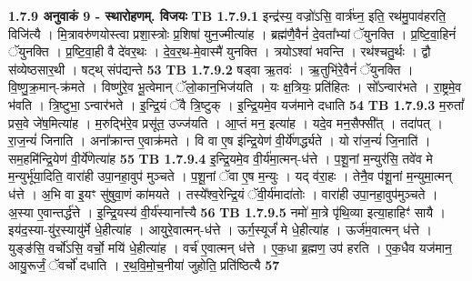 \documentclass[17pt]{extarticle}
\begin{document}
                \textbf{ 1.7.9     अनुवाकं   9 - स्थारोहणम्. विजयः} \newline
                                \textbf{ TB 1.7.9.1} \newline
                  इन्द्र॑स्य॒ वज्रो॑ऽसि॒ वार्त्र॑घ्न॒ इति॒ रथ॑मु॒पाव॑हरति॒ विजि॑त्यै । मि॒त्रावरु॑णयोस्त्वा प्रशा॒स्त्रोः प्र॒शिषा॑ युन॒ज्मीत्या॑ह । ब्रह्म॑णै॒वैनं॑ दे॒वता᳚भ्यां ॅयुनक्ति । प्र॒ष्टि॒वा॒हिनं॑ ॅयुनक्ति । प्र॒ष्टि॒वा॒ही वै दे॑वर॒थः । दे॒व॒र॒थ-मे॒वास्मै॑ युनक्ति । त्रयोऽश्वा॑ भवन्ति । रथ॑श्चतु॒र्थः । द्वौ स॑व्येष्ठसार॒थी । षट्थ् संप॑द्यन्ते \textbf{ 53} \newline
                  \newline
                                \textbf{ TB 1.7.9.2} \newline
                  षड्वा ऋ॒तवः॑ । ऋ॒तुभि॑रे॒वैनं॑ ॅयुनक्ति । वि॒ष्णु॒क्र॒मान्-क्र॑मते । विष्णु॑रे॒व भू॒त्वेमान् ॅलो॒कान॒भिज॑यति । यः क्ष॒त्रियः॒ प्रति॑हितः । सो᳚ऽन्वार॑भते । रा॒ष्ट्रमे॒व भ॑वति । त्रि॒ष्टुभा॒ ऽन्वार॑भते । इ॒न्द्रि॒यं ॅवै त्रि॒ष्टुक् । इ॒न्द्रि॒यमे॒व यज॑माने दधाति \textbf{ 54} \newline
                  \newline
                                \textbf{ TB 1.7.9.3} \newline
                  म॒रुतां᳚ प्रस॒वे जे॑ष॒मित्या॑ह । म॒रुद्भि॑रे॒व प्रसू॑त॒ उज्ज॑यति । आ॒प्तं मन॒ इत्या॑ह । यदे॒व मन॒सैफ्सी᳚त् । तदा॑पत् । रा॒ज॒न्यं॑ जिनाति । अना᳚क्रान्त ए॒वाक्र॑मते । वि वा ए॒ष इ॑न्द्रि॒येण॑ वी॒र्ये॑णर्द्ध्यते । यो रा॑ज॒न्यं॑ जि॒नाति॑ । सम॒हमि॑न्द्रि॒येण॑ वी॒र्ये॑णेत्या॑ह \textbf{ 55} \newline
                  \newline
                                \textbf{ TB 1.7.9.4} \newline
                  इ॒न्द्रि॒यमे॒व वी॒र्य॑मा॒त्मन्-ध॑त्ते । प॒शू॒नां म॒न्युर॑सि॒ तवे॑व मे म॒न्युर्भू॑या॒दिति॒ वारा॑ही उपा॒नहा॒वुप॑ मुञ्चते । प॒शू॒नां ॅवा ए॒ष म॒न्युः । यद् व॑रा॒हः । तेनै॒व प॑शू॒नां म॒न्युमा॒त्मन् ध॑त्ते । अ॒भि वा इ॒यꣳ सु॑षुवा॒णं का॑मयते । तस्ये᳚श्व॒रेन्द्रि॒यं ॅवी॒र्य॑मादा॑तोः । वारा॑ही उपा॒नहा॒वुप॑मुञ्चते । अ॒स्या ए॒वान्तर्द्ध॑त्ते । इ॒न्द्रि॒यस्य॑ वी॒र्य॑स्याना᳚त्त्यै \textbf{ 56} \newline
                  \newline
                                \textbf{ TB 1.7.9.5} \newline
                  नमो॑ मा॒त्रे पृ॑थि॒व्या इत्या॒हाहिꣳ॑ सायै । इय॑द॒स्या-यु॑र॒स्यायु॑र्मे धे॒हीत्या॑ह । आयुरे॒वात्मन्-ध॑त्ते । ऊर्ग॒स्यूर्जं॑ मे धे॒हीत्या॑ह । ऊर्ज॑म॒वात्मन् ध॑त्ते । युङ्ङ॑सि॒ वर्चो॑ऽसि॒ वर्चो॒ मयि॑ धे॒हीत्या॑ह । वर्च॑ ए॒वात्मन् ध॑त्ते । ए॒क॒धा ब्र॒ह्मण॒ उप॑ हरति । ए॒क॒धैव यज॑मान॒ आयु॒रूर्जं॒ ॅवर्चो॑ दधाति । र॒थ॒वि॒मो॒च॒नीया॑ जुहोति॒ प्रति॑ष्ठित्यै \textbf{ 57} \newline
\end{document}
